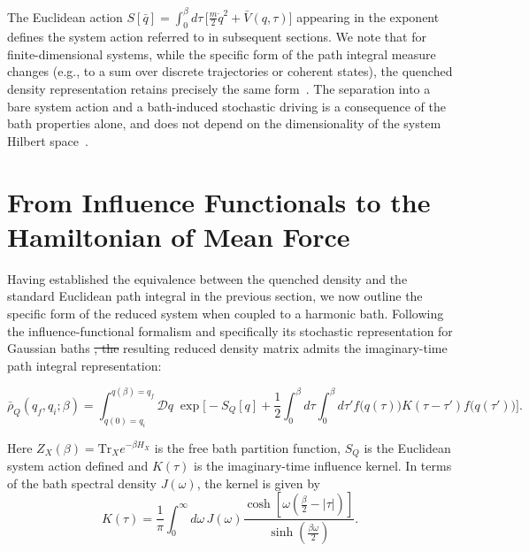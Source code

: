 ﻿\documentclass[aps,prl,twocolumn,superscriptaddress,showpacs,floatfix]{revtex4-2}
\makeatletter
\newcommand{\Tr}{\mathrm{Tr}}
\providecommand{\DIFaddtex}[1]{{\protect\color{blue}\uwave{#1}}} %
\providecommand{\DIFdeltex}[1]{{\protect\color{red}\sout{#1}}} %
\providecommand{\DIFaddbegin}{} %
\providecommand{\DIFaddend}{} %
\providecommand{\DIFdelbegin}{} %
\providecommand{\DIFdelend}{} %
\providecommand{\DIFadd}[1]{\texorpdfstring{\DIFaddtex{#1}}{#1}} %
\providecommand{\DIFdel}[1]{\texorpdfstring{\DIFdeltex{#1}}{}} %
\providecommand{\DIFscaledelfig}{0.5}
\newlength{\DIFdelgraphicswidth} %
\newlength{\DIFdelgraphicsheight} %
\providecommand{\DIFaddincludegraphics}[2][]{{\color{blue}\fbox{\DIFOincludegraphics[#1]{#2}}}} %
\providecommand{\DIFdelincludegraphics}[2][]{%
\sbox{\DIFdelgraphicsbox}{\DIFOincludegraphics[#1]{#2}}%
\settoboxwidth{\DIFdelgraphicswidth}{\DIFdelgraphicsbox} %
\settoboxtotalheight{\DIFdelgraphicsheight}{\DIFdelgraphicsbox} %
\scalebox{\DIFscaledelfig}{%
\parbox[b]{\DIFdelgraphicswidth}{\usebox{\DIFdelgraphicsbox}\\[-\baselineskip] \rule{\DIFdelgraphicswidth}{0em}}\llap{\resizebox{\DIFdelgraphicswidth}{\DIFdelgraphicsheight}{%
\setlength{\unitlength}{\DIFdelgraphicswidth}%
\begin{picture}(1,1)%
\thicklines\linethickness{2pt} %
{\color[rgb]{1,0,0}\put(0,0){\framebox(1,1){}}}%
{\color[rgb]{1,0,0}\put(0,0){\line( 1,1){1}}}%
{\color[rgb]{1,0,0}\put(0,1){\line(1,-1){1}}}%
\end{picture}%
}\hspace*{3pt}}} %
} %
\DeclareRobustCommand{\DIFaddbegin}{\DIFOaddbegin \let\includegraphics\DIFaddincludegraphics} %
\DeclareRobustCommand{\DIFaddend}{\DIFOaddend \let\includegraphics\DIFOincludegraphics} %
\DeclareRobustCommand{\DIFdelbegin}{\DIFOdelbegin \let\includegraphics\DIFdelincludegraphics} %
\DeclareRobustCommand{\DIFdelend}{\DIFOaddend \let\includegraphics\DIFOincludegraphics} %
\let\sout@orig\sout %
\renewcommand{\sout}[1]{\ifmmode\text{\sout@orig{\ensuremath{#1}}}\else\sout@orig{#1}\fi} %
\makeatother
\begin{document}
The Euclidean action $S[\bar q]=\int_0^\beta d\tau\,\big[\frac{m}{2}\dot q^2+\bar V(q,\tau)\big]$
appearing in the exponent defines the system action referred to in subsequent
sections. We note that for finite-dimensional systems, while the specific form of the path integral measure changes (e.g., to a sum over discrete trajectories or coherent states), the quenched density representation retains precisely the same form~\cite{weissQuantumDissipativeSystems2012, altlandCondensedMatterField2010}. The separation into a bare system action and a bath-induced stochastic driving is a consequence of the bath properties alone, and does not depend on the dimensionality of the system Hilbert space~\cite{leggettDynamicsDissipativeTwostate1987}.
 \section{\label{sec:influence_to_hmf}From Influence Functionals to the Hamiltonian of Mean Force}
Having established the equivalence between the quenched density and the standard Euclidean path integral in the previous section, we now outline the specific form of the reduced system when coupled to a harmonic bath. Following the influence-functional formalism \cite{feynmanTheoryGeneralQuantum1963a,caldeiraQuantumTunnellingDissipative1983a,grabertQuantumBrownianMotion1988} and specifically its stochastic representation for Gaussian baths \cite{mccaulPartitionfreeApproachOpen2017c, mccaulDrivingSpinbosonModels2018a, mccaulHowWinFriends2021b}\DIFdelbegin \DIFdel{, the }\DIFdelend \DIFaddbegin \DIFadd{. The }\DIFaddend resulting reduced density matrix admits the imaginary-time path integral representation:
\begin{widetext}
\begin{equation}
    \bar\rho_Q(q_f,q_i;\beta) = \int_{q(0)=q_i}^{q(\beta)=q_f}\!\!\mathcal D q\; \exp\Bigg[ -S_Q[q] + \frac{1}{2}\int_0^\beta d\tau\int_0^\beta d\tau' f\big(q(\tau)\big) K(\tau-\tau') f\big(q(\tau')\big) \Bigg].
    \label{eq:reduced_effective_PI}
\end{equation}
\end{widetext}
Here $Z_X(\beta)=\Tr_X e^{-\beta H_X}$ is the free bath partition function, $S_Q$ is the Euclidean system action defined and $K(\tau)$ is the imaginary-time influence kernel. In terms of the bath spectral density $J(\omega)$, the kernel is given by~\cite{weissQuantumDissipativeSystems2012, feynmanTheoryGeneralQuantum1963a}
\begin{equation}
    K(\tau) = \frac{1}{\pi}\int_0^\infty d\omega\, J(\omega) \frac{\cosh\!\left[\omega\left(\frac{\beta}{2}-|\tau|\right)\right]}{\sinh\!\left(\frac{\beta\omega}{2}\right)}.
    \label{eq:kernel_spectral}
\end{equation}
\end{document}
